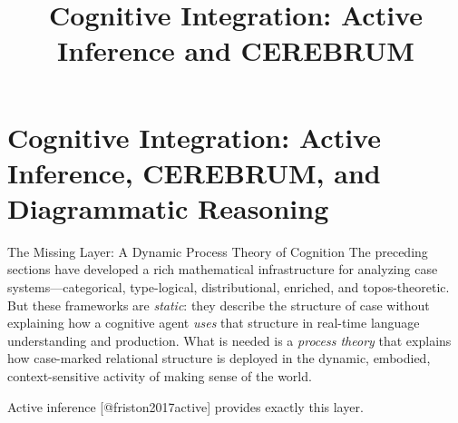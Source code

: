 \documentclass[
  ignorenonframetext,
]{beamer}
\title{\texorpdfstring{Cognitive Integration: Active Inference and
CEREBRUM}{Cognitive Integration: Active Inference and CEREBRUM}}
\author{\texorpdfstring{}{}}
\date{}
\begin{document}
\frame{\titlepage}

\section{Cognitive Integration: Active Inference, CEREBRUM, and
Diagrammatic Reasoning}\label{sec:cognitive-integration}

\begin{frame}{The Missing Layer: A Dynamic Process Theory of Cognition}
\protect{}\label{the-missing-layer-a-dynamic-process-theory-of-cognition}
The preceding sections have developed a rich mathematical infrastructure
for analyzing case systems---categorical, type-logical, distributional,
enriched, and topos-theoretic. But these frameworks are \emph{static}:
they describe the structure of case without explaining how a cognitive
agent \emph{uses} that structure in real-time language understanding and
production. What is needed is a \emph{process theory} that explains how
case-marked relational structure is deployed in the dynamic, embodied,
context-sensitive activity of making sense of the world.

Active inference {[}@friston2017active{]} provides exactly this layer.
\end{frame}
\end{document}
